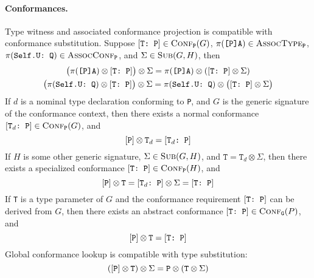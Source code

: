 \documentclass[../generics]{subfiles}
\begin{document}
\paragraph{Conformances.} Type witness and associated conformance projection is compatible with conformance substitution. Suppose $[\texttt{T:~P}]\in\textsc{Conf}_{\texttt{P}}({G})$, $\pi(\texttt{[P]A})\in\textsc{AssocType}_{\texttt{P}}$, $\pi(\texttt{Self.U:~Q})\in\textsc{AssocConf}_{\texttt{P}}$, and $\Sigma\in\textsc{Sub}({G, H})$, then
\begin{gather*}
\bigl(\pi(\texttt{[P]A})\otimes [\texttt{T:~P}]\bigr)\otimes \Sigma=\pi(\texttt{[P]A})\otimes ([\texttt{T:~P}]\otimes \Sigma)\\
\bigl(\pi(\texttt{Self.U:~Q})\otimes [\texttt{T:~P}]\bigr)\otimes \Sigma=\pi(\texttt{Self.U:~Q})\otimes \bigl([\texttt{T:~P}]\otimes \Sigma\bigr)
\end{gather*}
If $d$ is a nominal type declaration conforming to \texttt{P}, and $G$ is the generic signature of the conformance context, then there exists a normal conformance $[\texttt{$\texttt{T}_d$:~P}]\in\textsc{Conf}_{\texttt{P}}({G})$, and
\[[\texttt{P}]\otimes\texttt{T}_d=[\texttt{$\texttt{T}_d$:~P}]\]
If $H$ is some other generic signature, $\Sigma\in\textsc{Sub}({G, H})$, and $\texttt{T}=\texttt{T}_d\otimes \Sigma$, then there exists a specialized conformance $[\texttt{T:~P}]\in\textsc{Conf}_{\texttt{P}}({H})$, and
\[[\texttt{P}]\otimes\texttt{T}=[\texttt{$\texttt{T}_d$:~P}]\otimes \Sigma = [\texttt{T:~P}]\]
If \texttt{T} is a type parameter of $G$ and the conformance requirement $[\texttt{T:~P}]$ can be derived from $G$, then there exists an abstract conformance $[\texttt{T:~P}]\in\textsc{Conf}_{\texttt{G}}({P})$, and
\[[\texttt{P}]\otimes\texttt{T} = [\texttt{T:~P}]\]
Global conformance lookup is compatible with type substitution:
\[([\texttt{P}]\otimes\texttt{T})\otimes \Sigma = \texttt{P}\otimes(\texttt{T}\otimes \Sigma)\]
\end{document}

